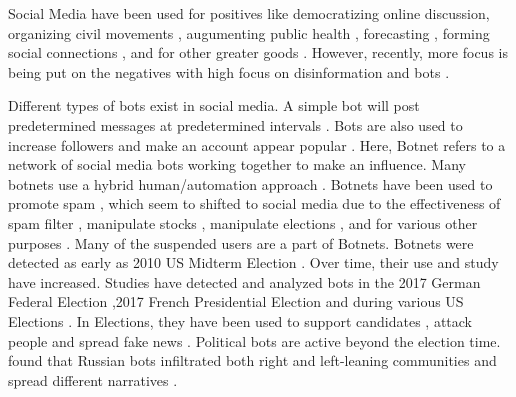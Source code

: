\documentclass[letterpaper]{article}
\begin{document}
Social Media have been used for positives like democratizing online discussion, organizing civil movements \cite{gonzalez2013broadcasters}, augumenting public health 
\cite{dredze2012social}, forecasting \cite{asur2010predicting,nguyen2015sentiment,liu2016predicting}, forming social connections \cite{ellison2007benefits}, and 
for other greater goods \cite{moorhead2013new,househ2014empowering}. However, recently, more focus is being put on the negatives with high focus on disinformation and bots
\cite{forelle2015political,bradshaw2017troops,marwick2017media}. \par

Different types of bots exist in social media. A simple bot will post predetermined messages at predetermined intervals \cite{haustein2016tweets}. Bots are also used to increase followers
and make an account appear popular \cite{cresci2015fame}. Here, Botnet refers to a network of social media bots working together to make an influence. Many botnets use 
a hybrid human/automation approach \cite{grimme2018changing}. Botnets have been used to promote spam \cite{ferrara2018measuring}, which seem to shifted to social media due to the effectiveness of spam filter \cite{gao2010detecting,chu2012detecting,ferrara2018measuring}, 
manipulate stocks \cite{ferrara2015manipulation}, manipulate elections \cite{morstatter2018alt}, 
and for various other purposes \cite{abokhodair2015dissecting}. Many of the suspended users are a part of Botnets.
Botnets were detected as early as 2010 US Midterm Election \cite{mitter2014categorization}. Over time, their use and
 study have increased. Studies have detected and analyzed bots in the 2017 German Federal Election \cite{morstatter2018alt} ,2017 French Presidential Election \cite{ferrara2017disinformation} and during 
various US Elections \cite{mitter2014categorization,bovet2019influence,rizoiu2018debatenight,bessi2016social,howard2018algorithms,howard2016bots,deb2019perils}. In Elections, 
they have been used to support candidates \cite{luceri2019red}, attack people \cite{mueller_investigation} and spread fake news \cite{vosoughi2018spread,grinberg2019fake}. 
Political bots are active beyond the election time. \cite{stewart2018examining} found that Russian bots infiltrated both right and left-leaning communities and spread different narratives 
\cite{mueller_investigation}. \par
\end{document}
